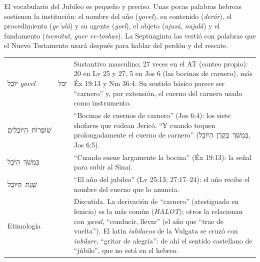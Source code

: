 \documentclass[11pt,letterpaper]{article}
\newcommand{\heb}[1]{\mbox{\foreignlanguage{hebrew}{#1}}}
\begin{document}
El vocabulario del Jubileo es pequeño y preciso. Unas pocas palabras hebreas sostienen la institución: el nombre del año (\emph{yovel}), su contenido (\emph{derór}), el procedimiento (\emph{ge'ulá}) y su agente (\emph{goel}), el objeto (\emph{ajuzá}, \emph{najalá}) y el fundamento (\emph{tsemitut}, \emph{guer ve-toshav}). La Septuaginta las vertió con palabras que el Nuevo Testamento usará después para hablar del perdón y del rescate.

\begin{filologia}
\begin{tabular}{@{}L{3.3cm}L{1.4cm}L{9.85cm}@{}}
\heb{יוֹבֵל} \emph{yovel} & \heb{יבל} & Sustantivo masculino; 27 veces en el AT (conteo propio): 20 en Lv 25 y 27, 5 en Jos 6 (las bocinas de carnero), más Éx 19:13 y Nm 36:4. Su sentido básico parece ser ``carnero'' y, por extensión, el cuerno del carnero usado como instrumento. \\[2pt]
\heb{שׁוֹפְרוֹת הַיּוֹבְלִים} & & ``Bocinas de cuernos de carnero'' (Jos 6:4): los siete shofares que rodean Jericó. ``Y cuando toquen prolongadamente el cuerno de carnero'' (\heb{בִּמְשֹׁךְ בְּקֶרֶן הַיּוֹבֵל}, Jos 6:5). \\[2pt]
\heb{בִּמְשֹׁךְ הַיֹּבֵל} & & ``Cuando suene largamente la bocina'' (Éx 19:13): la señal para subir al Sinaí. \\[2pt]
\heb{שְׁנַת הַיּוֹבֵל} & & ``El año del jubileo'' (Lv 25:13; 27:17--24): el año recibe el nombre del cuerno que lo anuncia. \\[2pt]
Etimología & & Discutida. La derivación de ``carnero'' (atestiguada en fenicio) es la más común (\emph{HALOT}); otros la relacionan con \emph{yaval}, ``conducir, llevar'' (el año que ``trae de vuelta''). El latín \emph{iubilaeus} de la Vulgata se cruzó con \emph{iubilare}, ``gritar de alegría'': de ahí el sentido castellano de ``júbilo'', que no está en el hebreo. \\
\end{tabular}
\end{filologia}
\end{document}
